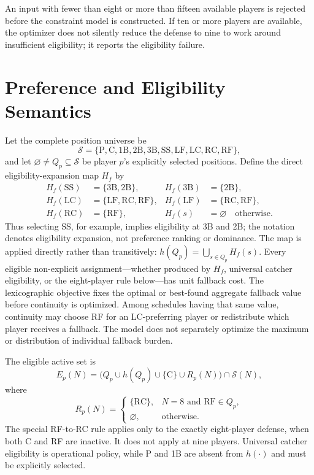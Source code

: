\documentclass[11pt]{article}
\begin{document}
An input with fewer than eight or more than fifteen available players is
rejected before the constraint model is constructed. If ten or more players
are available, the optimizer does not silently reduce the defense to nine to
work around insufficient eligibility; it reports the eligibility failure.

\section{Preference and Eligibility Semantics}

Let the complete position universe be
\[
\mathcal{S}=\{\mathrm{P,C,1B,2B,3B,SS,LF,LC,RC,RF}\},
\]
and let $\varnothing\neq Q_p\subseteq\mathcal S$ be player $p$'s explicitly
selected positions. Define the direct eligibility-expansion map $H_f$ by
\[
\begin{aligned}
H_f(\mathrm{SS})&=\{\mathrm{3B,2B}\}, &
H_f(\mathrm{3B})&=\{\mathrm{2B}\},\\
H_f(\mathrm{LC})&=\{\mathrm{LF,RC,RF}\}, &
H_f(\mathrm{LF})&=\{\mathrm{RC,RF}\},\\
H_f(\mathrm{RC})&=\{\mathrm{RF}\}, &
H_f(s)&=\varnothing\quad\text{otherwise}.
\end{aligned}
\]
Thus selecting SS, for example, implies eligibility at 3B and 2B; the notation
denotes eligibility expansion, not preference ranking or dominance. The map is
applied directly rather than transitively:
$h(Q_p)=\bigcup_{s\in Q_p}H_f(s)$.
Every eligible non-explicit assignment---whether produced by $H_f$, universal
catcher eligibility, or the eight-player rule below---has unit fallback cost.
The lexicographic objective fixes the optimal or best-found aggregate fallback
value before continuity is optimized. Among schedules having that same value,
continuity may choose RF for an LC-preferring player or redistribute which
player receives a fallback. The model does not separately optimize the maximum
or distribution of individual fallback burden.

The eligible active set is
\begin{equation}
E_p(N) = \bigl(Q_p\cup h(Q_p)\cup\{\mathrm{C}\}\cup R_p(N)\bigr)
      \cap\mathcal{S}(N),
\label{eq:eligibility}
\end{equation}
where
\[
R_p(N) =
\begin{cases}
\{\mathrm{RC}\}, & N=8\text{ and }\mathrm{RF}\in Q_p,\\
\varnothing, & \text{otherwise.}
\end{cases}
\]
The special RF-to-RC rule applies only to the exactly eight-player defense,
when both C and RF are inactive. It does not apply at nine players. Universal
catcher eligibility is operational policy, while P and 1B are absent from
$h(\cdot)$ and must be explicitly selected.
\end{document}

